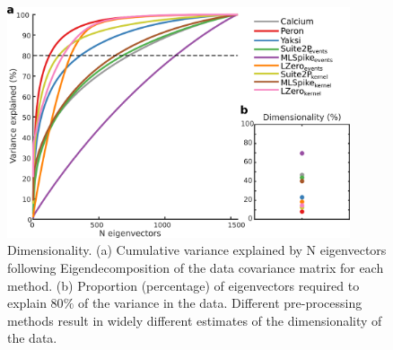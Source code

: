 \documentclass[a4paper,10pt,twocolumn]{article}
\begin{document}
\begin{figure}[H]
\includegraphics[width=0.9\textwidth]{full_figs_19v2/why_deconvolve_F7_19v2.png}
\caption{\label{fig:dimensionality}Dimensionality. (a) Cumulative variance explained by N eigenvectors following Eigendecomposition of the data covariance matrix for each method. (b) Proportion (percentage) of eigenvectors required to explain 80$\%$ of the variance in the data. Different pre-processing methods result in widely different estimates of the dimensionality of the data.}
\end{figure}




\end{document}
